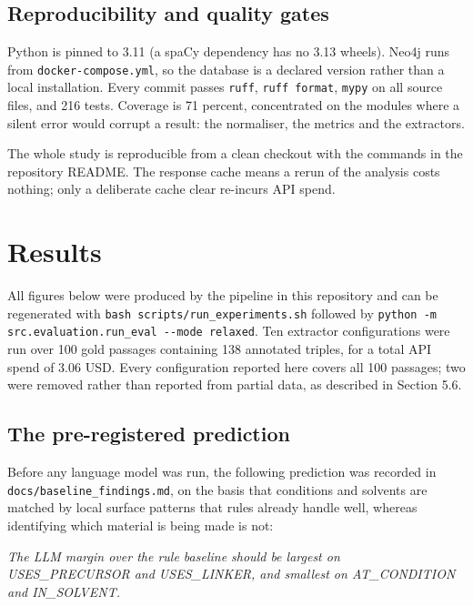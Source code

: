 \documentclass[11pt,a4paper,oneside]{report}
\newenvironment{pullquote}
  {\begin{list}{}{\setlength{\leftmargin}{1.4em}\setlength{\rightmargin}{0pt}}\item[]%
   \itshape\color{ink}}
  {\end{list}}
\begin{document}
\section{Reproducibility and quality gates}

Python is pinned to 3.11 (a spaCy dependency has no 3.13 wheels). Neo4j runs from \texttt{docker-\allowbreak{}compose.\allowbreak{}yml}, so the database is a declared version rather than a local installation. Every commit passes \texttt{ruff}, \texttt{ruff format}, \texttt{mypy} on all source files, and 216 tests. Coverage is 71 percent, concentrated on the modules where a silent error would corrupt a result: the normaliser, the metrics and the extractors.

The whole study is reproducible from a clean checkout with the commands in the repository README. The response cache means a rerun of the analysis costs nothing; only a deliberate cache clear re-incurs API spend.


\chapter{Results}


All figures below were produced by the pipeline in this repository and can be regenerated with \texttt{bash scripts/\allowbreak{}run\_\allowbreak{}experiments.\allowbreak{}sh} followed by \texttt{python -\allowbreak{}m src.\allowbreak{}evaluation.\allowbreak{}run\_\allowbreak{}eval -\allowbreak{}-\allowbreak{}mode relaxed}. Ten extractor configurations were run over 100 gold passages containing 138 annotated triples, for a total API spend of 3.06 USD. Every configuration reported here covers all 100 passages; two were removed rather than reported from partial data, as described in Section 5.6.

\section{The pre-registered prediction}

Before any language model was run, the following prediction was recorded in \texttt{docs/\allowbreak{}baseline\_\allowbreak{}findings.\allowbreak{}md}, on the basis that conditions and solvents are matched by local surface patterns that rules already handle well, whereas identifying which material is being made is not:

\begin{pullquote}
The LLM margin over the rule baseline should be largest on USES\_PRECURSOR and USES\_LINKER, and smallest on AT\_CONDITION and IN\_SOLVENT.
\end{pullquote}
\end{document}
